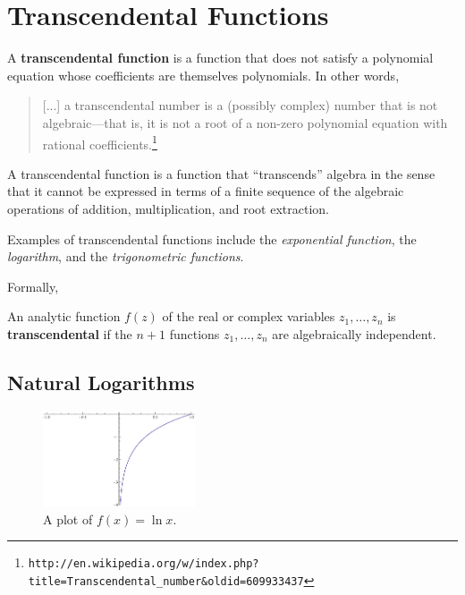 \chapter{Transcendental Functions}

A \textbf{transcendental function} is a function that does not satisfy a polynomial equation whose coefficients are themselves polynomials.
In other words,

\begin{quote}
[...] a transcendental number is a (possibly complex) number that is not algebraic---that is, it is not a root of a non-zero polynomial equation with rational coefficients.\footnote{%
\texttt{http://en.wikipedia.org/w/index.php?title=Transcendental\_number\&oldid=609933437}}
\end{quote}

A transcendental function is a function that ``transcends'' algebra in the sense that it cannot be expressed in terms of a finite sequence of the algebraic operations of addition, multiplication, and root extraction.

Examples of transcendental functions include the \emph{exponential function}, the \emph{logarithm}, and the \emph{trigonometric functions}.

Formally,

\begin{defn}
  An analytic function \(f(z)\) of the real or complex variables \(z_1, \ldots, z_n\) is \textbf{transcendental} if the \(n+1\) functions \(z_1, \ldots, z_n\) are algebraically independent.
  \cite{wiki:transcendental}
\end{defn}

\section{Natural Logarithms}
\begin{figure}[h]
  \begin{center}
    \includegraphics[width=0.4\textwidth]{continuous/transcend/natlog}
  \end{center}
  \caption{A plot of $f(x) =\ln x$.}
  \label{fig:natlog}
\end{figure}

